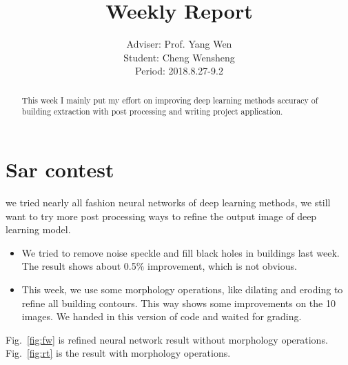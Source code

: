 \documentclass[]{IEEEtran}
\begin{document}
	\title{Weekly Report}
	\author{Adviser: Prof. Yang Wen \\Student: Cheng Wensheng\\ Period: 2018.8.27-9.2
	}
	\maketitle

\begin{abstract}
	This week I mainly put my effort on improving deep learning methods accuracy of building extraction with post processing and writing project application.
\end{abstract}

\section{Sar contest}
	 we tried nearly all fashion neural networks of deep learning methods,	we still want to try more post processing ways to refine the output image of deep learning model.
	\begin{itemize}
		\item We tried to remove noise speckle and fill black holes in buildings last week. The result shows about 0.5$\%$ improvement, which is not obvious.
		\item This week, we use some morphology operations, like dilating and eroding to refine all building contours. This way shows some improvements on the 10 images. We handed in this version of code and waited for grading.
	\end{itemize}
	
	Fig.~\ref{fig:fw} is refined neural network result without morphology operations. Fig.~\ref{fig:rt} is the result with morphology operations.
\end{document}
